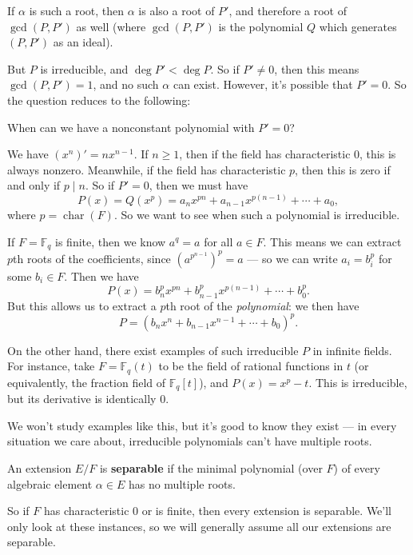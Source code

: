 If $\alpha$ is such a root, then $\alpha$ is also a root of $P'$, and therefore a root of $\gcd(P, P')$ as well (where $\gcd(P, P')$ is the polynomial $Q$ which generates $(P, P')$ as an ideal). 

But $P$ is irreducible, and $\deg P' < \deg P$. So if $P' \neq 0$, then this means $\gcd(P, P') = 1$, and no such $\alpha$ can exist. However, it's possible that $P' = 0$. So the question reduces to the following:

\begin{qq}
    When can we have a nonconstant polynomial with $P' = 0$?
\end{qq}

We have $(x^n)' = nx^{n - 1}$. If $n \geq 1$, then if the field has characteristic $0$, this is always nonzero. Meanwhile, if the field has characteristic $p$, then this is zero if and only if $p \mid n$. So if $P' = 0$, then we must have \[P(x) = Q(x^p) = a_nx^{pn} + a_{n - 1}x^{p(n - 1)} + \cdots + a_0,\] where $p = \operatorname{char}(F)$. So we want to see when such a polynomial is irreducible. 

If $F = \mathbb{F}_q$ is finite, then we know $a^q = a$ for all $a \in F$. This means we can extract $p$th roots of the coefficients, since $(a^{p^{n - 1}})^p = a$ --- so we can write $a_i = b_i^p$ for some $b_i \in F$. Then we have \[P(x) = b_n^px^{pn} + b_{n - 1}^px^{p(n - 1)} + \cdots + b_0^p.\] But this allows us to extract a $p$th root of the \emph{polynomial}: we then have \[P = (b_nx^n + b_{n - 1}x^{n - 1} + \cdots + b_0)^p.\] 

On the other hand, there exist examples of such irreducible $P$ in infinite fields. For instance, take $F = \mathbb{F}_q(t)$ to be the field of rational functions in $t$ (or equivalently, the fraction field of $\mathbb{F}_q[t]$), and $P(x) = x^p - t$. This is irreducible, but its derivative is identically $0$. 

We won't study examples like this, but it's good to know they exist --- in every situation we care about, irreducible polynomials can't have multiple roots.

\begin{definition}
    An extension $E/F$ is \textbf{separable} if the minimal polynomial (over $F$) of every algebraic element $\alpha \in E$ has no multiple roots. 
\end{definition}

So if $F$ has characteristic $0$ or is finite, then every extension is separable. We'll only look at these instances, so we will generally assume all our extensions are separable. 

